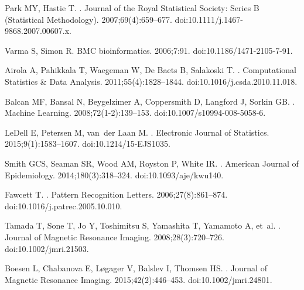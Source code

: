 \documentclass[10pt,letterpaper]{article}
\begin{document}
\begin{thebibliography}{10}
Park MY, Hastie T.
.
\newblock Journal of the Royal Statistical Society: Series B (Statistical
  Methodology). 2007;69(4):659--677.
\newblock doi:{10.1111/j.1467-9868.2007.00607.x}.

Varma S, Simon R.
\newblock BMC bioinformatics. 2006;7:91.
\newblock doi:{10.1186/1471-2105-7-91}.

Airola A, Pahikkala T, Waegeman W, {De Baets} B, Salakoski T.
.
\newblock Computational Statistics {\&} Data Analysis. 2011;55(4):1828--1844.
\newblock doi:{10.1016/j.csda.2010.11.018}.

Balcan MF, Bansal N, Beygelzimer A, Coppersmith D, Langford J, Sorkin GB.
.
\newblock Machine Learning. 2008;72(1-2):139--153.
\newblock doi:{10.1007/s10994-008-5058-6}.

LeDell E, Petersen M, van~der Laan M.
.
\newblock Electronic Journal of Statistics. 2015;9(1):1583--1607.
\newblock doi:{10.1214/15-EJS1035}.

Smith GCS, Seaman SR, Wood AM, Royston P, White IR.
.
\newblock American Journal of Epidemiology. 2014;180(3):318--324.
\newblock doi:{10.1093/aje/kwu140}.

Fawcett T.
.
\newblock Pattern Recognition Letters. 2006;27(8):861--874.
\newblock doi:{10.1016/j.patrec.2005.10.010}.

Tamada T, Sone T, Jo Y, Toshimitsu S, Yamashita T, Yamamoto A, et~al.
.
\newblock Journal of Magnetic Resonance Imaging. 2008;28(3):720--726.
\newblock doi:{10.1002/jmri.21503}.

Boesen L, Chabanova E, L{\o}gager V, Balslev I, Thomsen HS.
.
\newblock Journal of Magnetic Resonance Imaging. 2015;42(2):446--453.
\newblock doi:{10.1002/jmri.24801}.


\end{thebibliography}
\end{document}
